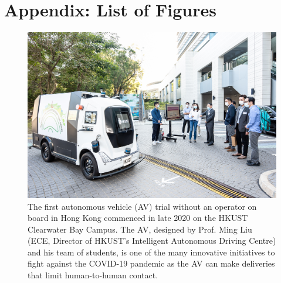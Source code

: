 \chapter*{Appendix: List of Figures}


\begin{figure}[!ht]
    \centering
    \includegraphics[width=0.9\columnwidth]{figure/pqe/hercules.jpg}
    \caption{The first autonomous vehicle (AV) trial without an operator on board in Hong Kong commenced in late 2020 on the HKUST Clearwater Bay Campus. The AV, designed by Prof. Ming Liu (ECE, Director of HKUST’s Intelligent Autonomous Driving Centre) and his team of students, is one of the many innovative initiatives to fight against the COVID-19 pandemic as the AV can make deliveries that limit human-to-human contact.}
    \label{fig:Hercules}
 \end{figure}

